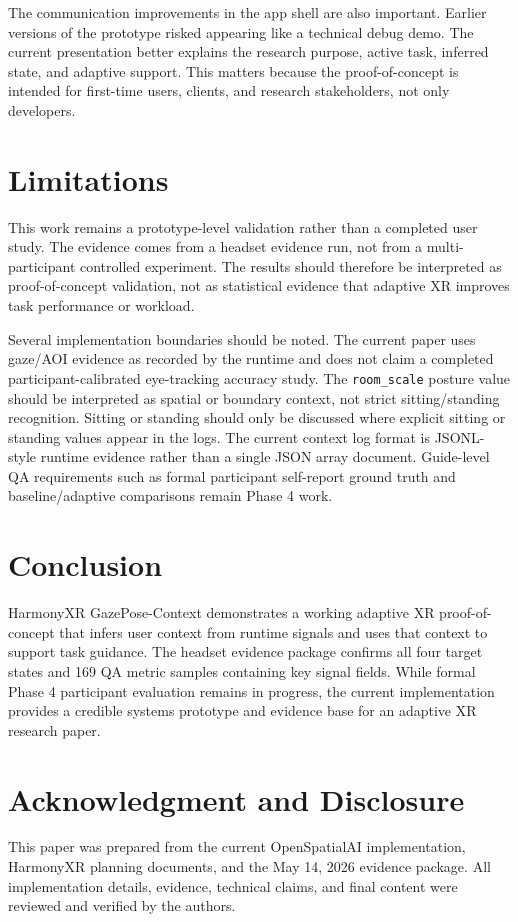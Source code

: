 \documentclass[conference]{IEEEtran}
\begin{document}
The communication improvements in the app shell are also important. Earlier versions of the prototype risked appearing like a technical debug demo. The current presentation better explains the research purpose, active task, inferred state, and adaptive support. This matters because the proof-of-concept is intended for first-time users, clients, and research stakeholders, not only developers.

\section{Limitations}
This work remains a prototype-level validation rather than a completed user study. The evidence comes from a headset evidence run, not from a multi-participant controlled experiment. The results should therefore be interpreted as proof-of-concept validation, not as statistical evidence that adaptive XR improves task performance or workload.

Several implementation boundaries should be noted. The current paper uses gaze/AOI evidence as recorded by the runtime and does not claim a completed participant-calibrated eye-tracking accuracy study. The \texttt{room\_scale} posture value should be interpreted as spatial or boundary context, not strict sitting/standing recognition. Sitting or standing should only be discussed where explicit sitting or standing values appear in the logs. The current context log format is JSONL-style runtime evidence rather than a single JSON array document. Guide-level QA requirements such as formal participant self-report ground truth and baseline/adaptive comparisons remain Phase 4 work.

\section{Conclusion}
HarmonyXR GazePose-Context demonstrates a working adaptive XR proof-of-concept that infers user context from runtime signals and uses that context to support task guidance. The headset evidence package confirms all four target states and 169 QA metric samples containing key signal fields. While formal Phase 4 participant evaluation remains in progress, the current implementation provides a credible systems prototype and evidence base for an adaptive XR research paper.

\section*{Acknowledgment and Disclosure}
This paper was prepared from the current OpenSpatialAI implementation, HarmonyXR planning documents, and the May 14, 2026 evidence package. All implementation details, evidence, technical claims, and final content were reviewed and verified by the authors.
\end{document}
